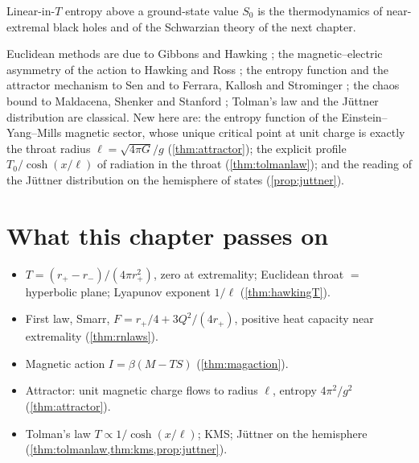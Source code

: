 Linear-in-$T$ entropy above a ground-state value $S_0$ is the thermodynamics of near-extremal black holes and of the Schwarzian theory of the next chapter.

\begin{litbox}
Euclidean methods are due to Gibbons and Hawking \cite{GibbonsHawking1977}; the magnetic--electric asymmetry of the action to Hawking and Ross \cite{HawkingRoss1995}; the entropy function and the attractor mechanism to Sen \cite{Sen2005} and to Ferrara, Kallosh and Strominger \cite{FKS1995}; the chaos bound to Maldacena, Shenker and Stanford \cite{MSS2016}; Tolman's law and the J\"uttner distribution are classical. New here are: the entropy function of the Einstein--Yang--Mills magnetic sector, whose unique critical point at unit charge is exactly the throat radius $\ell=\sqrt{4\pi G}/g$ (\cref{thm:attractor}); the explicit profile $T_0/\cosh(x/\ell)$ of radiation in the throat (\cref{thm:tolmanlaw}); and the reading of the J\"uttner distribution on the hemisphere of states (\cref{prop:juttner}).
\end{litbox}

\section*{What this chapter passes on}
\begin{itemize}[nosep]
\item $T=(r_+-r_-)/(4\pi r_+^2)$, zero at extremality; Euclidean throat $=$ hyperbolic plane; Lyapunov exponent $1/\ell$ (\cref{thm:hawkingT}).
\item First law, Smarr, $F=r_+/4+3Q^2/(4r_+)$, positive heat capacity near extremality (\cref{thm:rnlaws}).
\item Magnetic action $I=\beta(M-TS)$ (\cref{thm:magaction}).
\item Attractor: unit magnetic charge flows to radius $\ell$, entropy $4\pi^2/g^2$ (\cref{thm:attractor}).
\item Tolman's law $T\propto1/\cosh(x/\ell)$; KMS; J\"uttner on the hemisphere (\cref{thm:tolmanlaw,thm:kms,prop:juttner}).
\end{itemize}

